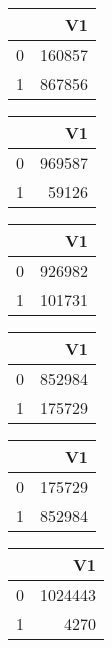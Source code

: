 \bigskip\bigskip
\centering
\begin{tabular}{rr}
  \hline
 & V1 \\ 
  \hline
0 & 160857 \\ 
  1 & 867856 \\ 
   \hline
\end{tabular}

\bigskip\bigskip
\centering
\begin{tabular}{rr}
  \hline
 & V1 \\ 
  \hline
0 & 969587 \\ 
  1 & 59126 \\ 
   \hline
\end{tabular}

\bigskip\bigskip
\centering
\begin{tabular}{rr}
  \hline
 & V1 \\ 
  \hline
0 & 926982 \\ 
  1 & 101731 \\ 
   \hline
\end{tabular}

\bigskip\bigskip
\centering
\begin{tabular}{rr}
  \hline
 & V1 \\ 
  \hline
0 & 852984 \\ 
  1 & 175729 \\ 
   \hline
\end{tabular}

\bigskip\bigskip
\centering
\begin{tabular}{rr}
  \hline
 & V1 \\ 
  \hline
0 & 175729 \\ 
  1 & 852984 \\ 
   \hline
\end{tabular}

\bigskip\bigskip
\centering
\begin{tabular}{rr}
  \hline
 & V1 \\ 
  \hline
0 & 1024443 \\ 
  1 & 4270 \\ 
   \hline
\end{tabular}

